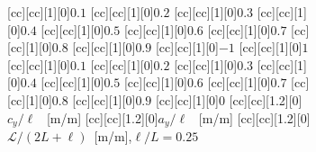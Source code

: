\begin{figure}[h!]
\centering
\begin{subfigure}[h]{0.8\textwidth}
[cc][cc][1][0]{$0.1$}
[cc][cc][1][0]{$0.2$}
[cc][cc][1][0]{$0.3$}
[cc][cc][1][0]{$0.4$}
[cc][cc][1][0]{$0.5$}
[cc][cc][1][0]{$0.6$}
[cc][cc][1][0]{$0.7$}
[cc][cc][1][0]{$0.8$}
[cc][cc][1][0]{$0.9$}
[cc][cc][1][0]{$-1$}
[cc][cc][1][0]{$1$}
[cc][cc][1][0]{$0.1$}
[cc][cc][1][0]{$0.2$}
[cc][cc][1][0]{$0.3$}
[cc][cc][1][0]{$0.4$}
[cc][cc][1][0]{$0.5$}
[cc][cc][1][0]{$0.6$}
[cc][cc][1][0]{$0.7$}
[cc][cc][1][0]{$0.8$}
[cc][cc][1][0]{$0.9$}
[cc][cc][1][0]{$0$}
[cc][cc][1.2][0]{$c_y/\ell$ \ [m/m]}
[cc][cc][1.2][0]{$a_y/\ell$ \ [m/m]}
[cc][cc][1.2][0]{$\mathcal{L}/(2L+\ell)$\ [m/m],\quad $\ell/L =0.25$}
\caption{}
\end{subfigure}


\end{figure}
